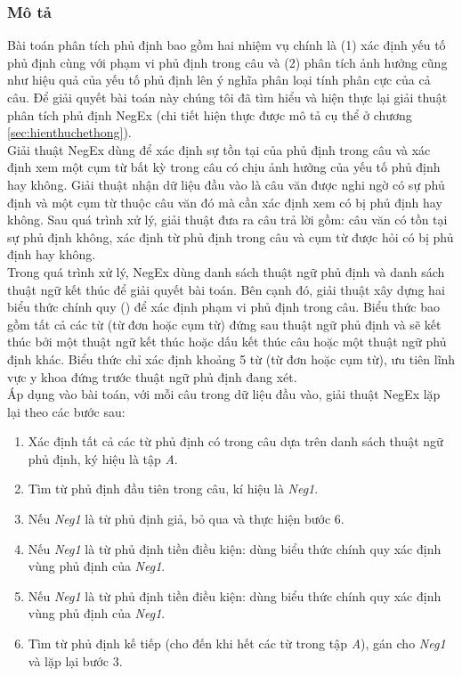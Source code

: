 \subsubsection*{Mô tả}
Bài toán phân tích phủ định bao gồm hai nhiệm vụ chính là (1) xác định yếu tố phủ định cùng với phạm vi phủ định trong câu và (2) phân tích ảnh hưởng cũng như hiệu quả của yếu tố phủ định lên ý nghĩa phân loại tính phân cực của cả câu. Để giải quyết bài toán này chúng tôi đã tìm hiểu và hiện thực lại giải thuật phân tích phủ định NegEx\cite{Tanushi2013} (chi tiết hiện thực được mô tả cụ thể ở chương \ref{sec:hienthuchethong}).\\

Giải thuật NegEx dùng để xác định sự tồn tại của phủ định trong câu và xác định xem một cụm từ bất kỳ trong câu có chịu ảnh hưởng của yếu tố phủ định hay không. Giải thuật nhận dữ liệu đầu vào là câu văn được nghi ngờ có sự phủ định và một cụm từ thuộc câu văn đó mà cần xác định xem có bị phủ định hay không. Sau quá trình xử lý, giải thuật đưa ra câu trả lời gồm: câu văn có tồn tại sự phủ định không, xác định từ phủ định trong câu và cụm từ được hỏi có bị phủ định hay không.\\ 

Trong quá trình xử lý, NegEx dùng danh sách thuật ngữ phủ định và danh sách thuật ngữ kết thúc để giải quyết bài toán. Bên cạnh đó, giải thuật xây dựng hai biểu thức chính quy  () để xác định phạm vi phủ định trong câu. Biểu thức  bao gồm tất cả các từ (từ đơn hoặc cụm từ) đứng sau thuật ngữ phủ định và sẽ kết thúc bởi một thuật ngữ kết thúc hoặc dấu kết thúc câu hoặc một thuật ngữ phủ định khác. Biểu thức  chỉ xác định khoảng 5 từ (từ đơn hoặc cụm từ), ưu tiên lĩnh vực y khoa đứng trước thuật ngữ phủ định đang xét. \\

Áp dụng vào bài toán, với mỗi câu trong dữ liệu đầu vào, giải thuật NegEx lặp lại theo các bước sau:

\begin{enumerate}
\item Xác định tất cả các từ phủ định có trong câu dựa trên danh sách thuật ngữ phủ định, ký hiệu là tập \textit{A}.
\item Tìm từ phủ định đầu tiên trong câu, kí hiệu là \textit{Neg1}.
\item Nếu \textit{Neg1} là từ phủ định giả, bỏ qua và thực hiện bước 6.
\item Nếu \textit{Neg1} là từ phủ định tiền điều kiện: dùng biểu thức chính quy  xác định vùng phủ định của \textit{Neg1}.
\item Nếu \textit{Neg1} là từ phủ định tiền điều kiện: dùng biểu thức chính quy  xác định vùng phủ định của \textit{Neg1}.
\item Tìm từ phủ định kế tiếp (cho đến khi hết các từ trong tập \textit{A}), gán cho \textit{Neg1} và lặp lại bước 3.
\end{enumerate}

